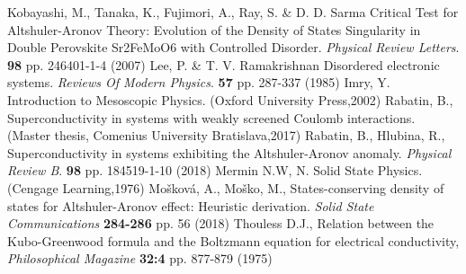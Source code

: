 \begin{thebibliography}{99}
Kobayashi, M., Tanaka, K., Fujimori, A., Ray, S. \& D. D. Sarma Critical Test for Altshuler-Aronov Theory: Evolution of the Density of States Singularity in Double Perovskite Sr2FeMoO6 with Controlled Disorder. {\em Physical Review Letters}. \textbf{98} pp. 246401-1-4 (2007)
Lee, P. \& T. V. Ramakrishnan Disordered electronic systems. {\em Reviews Of Modern Physics}. \textbf{57} pp. 287-337 (1985)
Imry, Y. Introduction to Mesoscopic Physics. (Oxford University Press,2002)
Rabatin, B., Superconductivity in systems with weakly screened Coulomb interactions. (Master thesis, Comenius University Bratislava,2017)
Rabatin, B., Hlubina, R.,  Superconductivity in systems exhibiting the Altshuler-Aronov anomaly. {\em Physical Review B}.  \textbf{98} pp. 184519-1-10 (2018)
Mermin N.W, N. Solid State Physics. (Cengage Learning,1976)
 Mošková, A., Moško, M.,  States-conserving density of states for Altshuler-Aronov effect: Heuristic derivation. {\em Solid State Communications  }  \textbf{284-286}   pp. 56 (2018)
 Thouless D.J.,  Relation between the Kubo-Greenwood formula and the Boltzmann equation for electrical conductivity, {\em Philosophical Magazine } \textbf{32:4}  pp. 877-879    (1975)
\end{thebibliography}